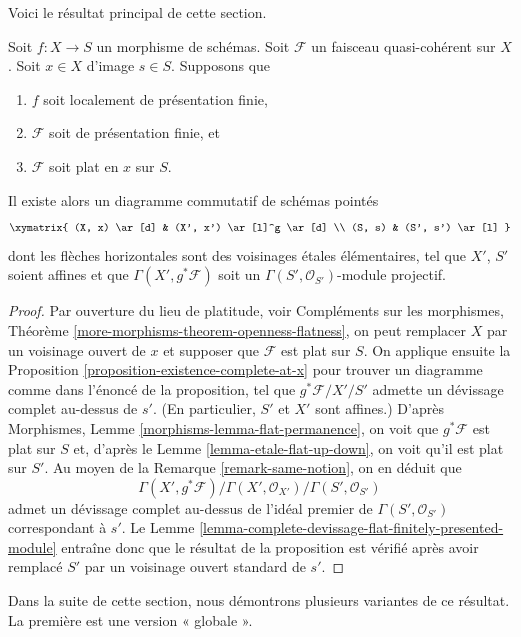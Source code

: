 \noindent
Voici le résultat principal de cette section.

\begin{proposition}
\label{proposition-finite-presentation-flat-at-point}
Soit $f : X \to S$ un morphisme de schémas.
Soit $\mathcal{F}$ un faisceau quasi-cohérent sur $X$.
Soit $x \in X$ d'image $s \in S$.
Supposons que
\begin{enumerate}
\item $f$ soit localement de présentation finie,
\item $\mathcal{F}$ soit de présentation finie, et
\item $\mathcal{F}$ soit plat en $x$ sur $S$.
\end{enumerate}
Il existe alors un diagramme commutatif de schémas pointés
$$
\xymatrix{
(X, x) \ar[d] & (X', x') \ar[l]^g \ar[d] \\
(S, s) & (S', s') \ar[l]
}
$$
dont les flèches horizontales sont des voisinages \'etales élémentaires,
tel que $X'$, $S'$ soient affines et que
$\Gamma(X', g^*\mathcal{F})$ soit un
$\Gamma(S', \mathcal{O}_{S'})$-module projectif.
\end{proposition}

\begin{proof}
Par ouverture du lieu de platitude, voir
Compléments sur les morphismes, Théorème \ref{more-morphisms-theorem-openness-flatness},
on peut remplacer $X$ par un voisinage ouvert de $x$ et supposer que
$\mathcal{F}$ est plat sur $S$. On applique ensuite la
Proposition \ref{proposition-existence-complete-at-x}
pour trouver un diagramme comme dans l'énoncé de la proposition,
tel que $g^*\mathcal{F}/X'/S'$ admette un d\'evissage complet au-dessus de $s'$.
(En particulier, $S'$ et $X'$ sont affines.) D'après
Morphismes, Lemme \ref{morphisms-lemma-flat-permanence},
on voit que $g^*\mathcal{F}$ est plat sur $S$ et, d'après le
Lemme \ref{lemma-etale-flat-up-down},
on voit qu'il est plat sur $S'$. Au moyen de la
Remarque \ref{remark-same-notion},
on en déduit que
$$
\Gamma(X', g^*\mathcal{F})/
\Gamma(X', \mathcal{O}_{X'})/
\Gamma(S', \mathcal{O}_{S'})
$$
admet un d\'evissage complet au-dessus de l'idéal premier de $\Gamma(S', \mathcal{O}_{S'})$
correspondant à $s'$. Le
Lemme \ref{lemma-complete-devissage-flat-finitely-presented-module}
entraîne donc que le résultat de la proposition est vérifié après avoir remplacé
$S'$ par un voisinage ouvert standard de $s'$.
\end{proof}

\noindent
Dans la suite de cette section, nous démontrons plusieurs variantes
de ce résultat. La première est une version « globale ».

